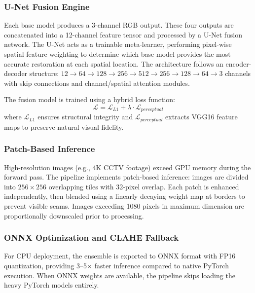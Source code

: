 \documentclass[conference]{IEEEtran}
\begin{document}
\subsubsection{U-Net Fusion Engine}

Each base model produces a 3-channel RGB output. These four outputs are concatenated into a 12-channel feature tensor and processed by a U-Net fusion network. The U-Net acts as a trainable meta-learner, performing pixel-wise spatial feature weighting to determine which base model provides the most accurate restoration at each spatial location. The architecture follows an encoder-decoder structure: $12 \rightarrow 64 \rightarrow 128 \rightarrow 256 \rightarrow 512 \rightarrow 256 \rightarrow 128 \rightarrow 64 \rightarrow 3$ channels with skip connections and channel/spatial attention modules.

The fusion model is trained using a hybrid loss function:
\begin{equation}
\mathcal{L} = \mathcal{L}_{L1} + \lambda \cdot \mathcal{L}_{perceptual}
\label{eq:loss}
\end{equation}
where $\mathcal{L}_{L1}$ ensures structural integrity and $\mathcal{L}_{perceptual}$ extracts VGG16 feature maps to preserve natural visual fidelity.

\subsubsection{Patch-Based Inference}

High-resolution images (e.g., 4K CCTV footage) exceed GPU memory during the forward pass. The pipeline implements patch-based inference: images are divided into $256 \times 256$ overlapping tiles with 32-pixel overlap. Each patch is enhanced independently, then blended using a linearly decaying weight map at borders to prevent visible seams. Images exceeding 1080 pixels in maximum dimension are proportionally downscaled prior to processing.

\subsubsection{ONNX Optimization and CLAHE Fallback}

For CPU deployment, the ensemble is exported to ONNX format with FP16 quantization, providing 3--5$\times$ faster inference compared to native PyTorch execution. When ONNX weights are available, the pipeline skips loading the heavy PyTorch models entirely.
\end{document}
